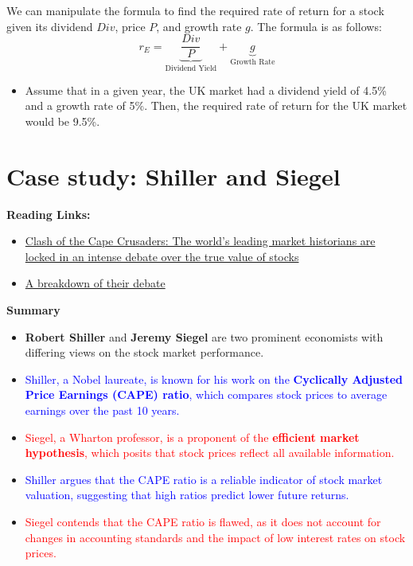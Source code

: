 We can manipulate the formula to find the required rate of return for a stock given its dividend $Div$, price $P$, and growth rate $g$. The formula is as follows:
\begin{equation}
    r_E = \underbrace{\frac{Div}{P}}_{\text{Dividend Yield} } + \underbrace{g}_{\text{Growth Rate}} 
\end{equation}

\begin{itemize}
    \item Assume that in a given year, the UK market had a dividend yield of 4.5\% and a growth rate of 5\%. Then, the required rate of return for the UK market would be 9.5\%.
\end{itemize}

\section{Case study: Shiller and Siegel}
\textbf{Reading Links:}
\begin{itemize}
    \item \href{https://www.ft.com/content/23c9f650-10c7-11e3-b5e4-00144feabdc0}{Clash of the Cape Crusaders: The world’s leading market historians are locked in an intense debate over the true value of stocks
    }
    \item \href{https://www.advisorperspectives.com/articles/2014/02/18/cape-crusaders-the-shiller-siegel-shootout-at-the-q-group-corral}{A breakdown of their debate}
    
    
\end{itemize}
\textbf{Summary}
\begin{itemize}
    \item \textbf{Robert Shiller} and \textbf{Jeremy Siegel} are two prominent economists with differing views on the stock market performance.
    \item \textcolor{blue}{Shiller, a Nobel laureate, is known for his work on the \textbf{Cyclically Adjusted Price Earnings (CAPE) ratio}, which compares stock prices to average earnings over the past 10 years.}
    \item \textcolor{red}{Siegel, a Wharton professor, is a proponent of the \textbf{efficient market hypothesis}, which posits that stock prices reflect all available information.}
    \item \textcolor{blue}{Shiller argues that the CAPE ratio is a reliable indicator of stock market valuation, suggesting that high ratios predict lower future returns.}
    \item \textcolor{red}{Siegel contends that the CAPE ratio is flawed, as it does not account for changes in accounting standards and the impact of low interest rates on stock prices.}
\end{itemize}

